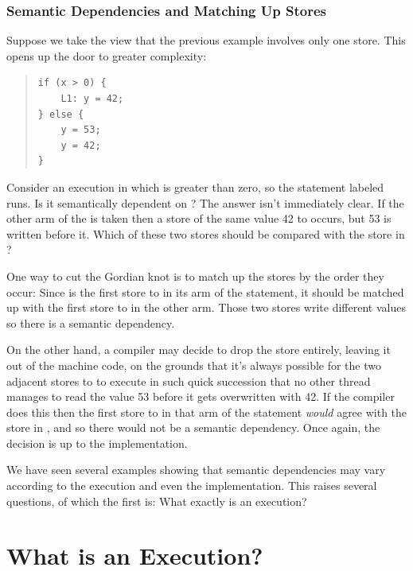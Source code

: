 \documentclass[10]{article}
\begin{document}
\subsubsection{Semantic Dependencies and Matching Up Stores}
\label{sec:Semantic Dependencies and Matching Up Stores}

Suppose we take the view that the previous example involves only one
store.
This opens up the door to greater complexity:
\begin{quote}
\begin{verbatim}
if (x > 0) {
    L1: y = 42;
} else {
    y = 53;
    y = 42;
}
\end{verbatim}
\end{quote}
Consider an execution in which  is greater than zero, so the
statement labeled  runs.
Is it semantically dependent on ?
The answer isn't immediately clear.
If the other arm of the  is taken then a store of the same value 42 to
 occurs, but 53 is written before it.
Which of these two stores should be compared with the store in ?

One way to cut the Gordian knot is to match up the stores by the order
they occur:
Since  is the first store to  in its arm of the 
statement, it should be matched up with the first store to  in
the other arm.
Those two stores write different values so there is a semantic
dependency.

On the other hand, a compiler may decide to drop the  store entirely, leaving it out of the machine code,
on the grounds that it's always possible for the two adjacent stores
to  to execute in such quick succession that no other thread
manages to read the value 53 before it gets overwritten with 42.
If the compiler does this then the first store to  in that
arm of the  statement \emph{would} agree with the store in
, and so there would not be a semantic dependency.
Once again, the decision is up to the implementation.

\medskip

We have seen several examples showing that semantic dependencies may vary
according to the execution and even the implementation.
This raises several questions, of which the first is:
What exactly is an execution?

\section{What is an Execution?}
\label{sec:What is an Execution?}
\end{document}
